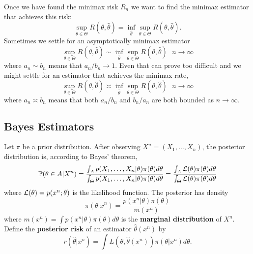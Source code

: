 \documentclass[twoside,12pt]{article}
\begin{document}
Once we have found the minimax risk $R_n$
we want to find the minimax estimator that achieves this risk:
\begin{equation}
\sup_{\theta\in\Theta}R(\theta,\widehat\theta) =
\inf_{\widehat\theta}\sup_{\theta\in\Theta}R(\theta,\widehat\theta).
\end{equation}
Sometimes we settle for an asymptotically minimax estimator
\begin{equation}
\sup_{\theta\in\Theta}R(\theta,\widehat\theta) \sim
\inf_{\widehat\theta}\sup_{\theta\in\Theta}R(\theta,\widehat\theta)\ \ \ n\to\infty
\end{equation}
where $a_n\sim b_n$ means that
$a_n/b_n\to 1$.
Even that can prove too difficult and we might
settle for an estimator that achieves the minimax rate,
\begin{equation}
\sup_{\theta\in\Theta}R(\theta,\widehat\theta) \asymp
\inf_{\widehat\theta}\sup_{\theta\in\Theta}R(\theta,\widehat\theta)\ \ \ n\to\infty
\end{equation}
where $a_n\asymp b_n$ means that
both $a_n/b_n$ and $b_n/a_n$ are both bounded as $n\to\infty$.






\subsection{Bayes Estimators}

Let $\pi$ be a prior distribution.
After observing $X^n=(X_1, \ldots, X_n)$,
the posterior distribution is, according to Bayes' theorem,
\begin{equation}
\mathbb{P}(\theta\in A|X^n)=
\frac{\int_A p(X_1, \ldots, X_n|\theta) \pi(\theta)d\theta}{\int_\Theta p(X_1, \ldots, X_n|\theta) \pi(\theta)d\theta}=
\frac{\int_A {\cal L}(\theta) \pi(\theta)d\theta}{\int_\Theta {\cal L}(\theta) \pi(\theta)d\theta}
\end{equation}
where ${\cal L}(\theta) = p(x^n;\theta)$ is the likelihood function.
The posterior has density
\begin{equation}
\pi(\theta|x^n) = \frac{ p(x^n|\theta) \pi(\theta)}{ m(x^n)}
\end{equation}
where
$m(x^n) = \int p(x^n|\theta) \pi(\theta) d\theta$
is the {\bf marginal distribution} of $X^n$.
Define the
{\bf posterior risk}
of an estimator $\widehat\theta(x^n)$ by
\begin{equation}
r(\widehat\theta |x^n) =  \int L(\theta,\widehat\theta(x^n)) \pi(\theta|x^n)  d\theta .
\end{equation}
\end{document}
